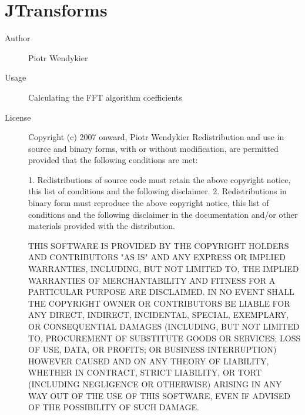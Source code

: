 \section*{JTransforms}
\begin{description}
    \item[Author] Piotr Wendykier
    \item[Usage] Calculating the FFT algorithm coefficients
    \item[License] \scriptsize Copyright (c) 2007 onward, Piotr Wendykier
    Redistribution and use in source and binary forms, with or without
modification, are permitted provided that the following conditions are met:

1. Redistributions of source code must retain the above copyright notice, this
   list of conditions and the following disclaimer. 
2. Redistributions in binary form must reproduce the above copyright notice,
   this list of conditions and the following disclaimer in the documentation
   and/or other materials provided with the distribution.

THIS SOFTWARE IS PROVIDED BY THE COPYRIGHT HOLDERS AND CONTRIBUTORS "AS IS" AND
ANY EXPRESS OR IMPLIED WARRANTIES, INCLUDING, BUT NOT LIMITED TO, THE IMPLIED
WARRANTIES OF MERCHANTABILITY AND FITNESS FOR A PARTICULAR PURPOSE ARE
DISCLAIMED. IN NO EVENT SHALL THE COPYRIGHT OWNER OR CONTRIBUTORS BE LIABLE FOR
ANY DIRECT, INDIRECT, INCIDENTAL, SPECIAL, EXEMPLARY, OR CONSEQUENTIAL DAMAGES
(INCLUDING, BUT NOT LIMITED TO, PROCUREMENT OF SUBSTITUTE GOODS OR SERVICES;
LOSS OF USE, DATA, OR PROFITS; OR BUSINESS INTERRUPTION) HOWEVER CAUSED AND
ON ANY THEORY OF LIABILITY, WHETHER IN CONTRACT, STRICT LIABILITY, OR TORT
(INCLUDING NEGLIGENCE OR OTHERWISE) ARISING IN ANY WAY OUT OF THE USE OF THIS
SOFTWARE, EVEN IF ADVISED OF THE POSSIBILITY OF SUCH DAMAGE.
\end{description}


